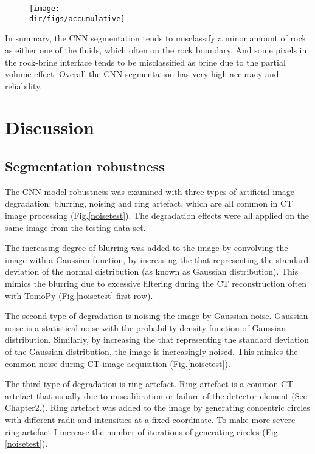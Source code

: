 \begin{figure}[htbp]
  \centering
  \texttt{[image: \\dir/figs/accumulative]}
  \caption{}
  \label{accumulative}
\end{figure}

In summary, the CNN segmentation tends to misclassify a minor amount of rock as either one of the fluids, which often on the rock boundary. And some pixels in the rock-brine interface tends to be misclassified as brine due to the partial volume effect. Overall the CNN segmentation has very high accuracy and reliability. 

\section{Discussion}
\subsection{Segmentation robustness}
The CNN model robustness was examined with three types of artificial image degradation: blurring, noising and ring artefact, which are all common in CT image processing (Fig.\ref{noisetest}). The degradation effects were all applied on the same image from the testing data set.

The increasing degree of blurring was added to the image by convolving the image with a Gaussian function, by increasing the \textsigma that representing the standard deviation of the normal distribution (as known as Gaussian distribution). This mimics the blurring due to excessive filtering during the CT reconstruction often with TomoPy (Fig.\ref{noisetest} first row).

The second type of degradation is noising the image by Gaussian noise. Gaussian noise is a statistical noise with the probability density function of Gaussian distribution. Similarly, by increasing the \textsigma that representing the standard deviation of the Gaussian distribution, the image is increasingly noised. This mimics the common noise during CT image acquisition (Fig.\ref{noisetest}). 

The third type of degradation is ring artefact. Ring artefact is a common CT artefact that usually due to miscalibration or failure of the detector element (See Chapter2.). Ring artefact was added to the image by generating concentric circles with different radii and intensities at a fixed coordinate. To make more severe ring artefact I increase the number of iterations of generating circles (Fig.\ref{noisetest}).

